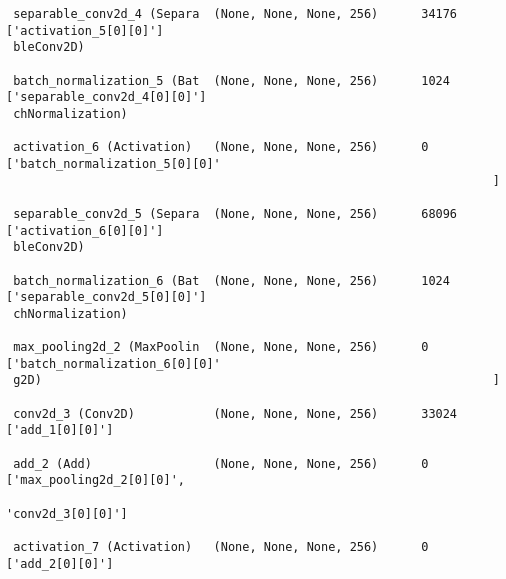 \documentclass[
  letterpaper,
  DIV=11,
  numbers=noendperiod]{scrreprt}
\begin{document}
\begin{verbatim}
 separable_conv2d_4 (Separa  (None, None, None, 256)      34176     ['activation_5[0][0]']        
 bleConv2D)                                                                                       
                                                                                                  
 batch_normalization_5 (Bat  (None, None, None, 256)      1024      ['separable_conv2d_4[0][0]']  
 chNormalization)                                                                                 
                                                                                                  
 activation_6 (Activation)   (None, None, None, 256)      0         ['batch_normalization_5[0][0]'
                                                                    ]                             
                                                                                                  
 separable_conv2d_5 (Separa  (None, None, None, 256)      68096     ['activation_6[0][0]']        
 bleConv2D)                                                                                       
                                                                                                  
 batch_normalization_6 (Bat  (None, None, None, 256)      1024      ['separable_conv2d_5[0][0]']  
 chNormalization)                                                                                 
                                                                                                  
 max_pooling2d_2 (MaxPoolin  (None, None, None, 256)      0         ['batch_normalization_6[0][0]'
 g2D)                                                               ]                             
                                                                                                  
 conv2d_3 (Conv2D)           (None, None, None, 256)      33024     ['add_1[0][0]']               
                                                                                                  
 add_2 (Add)                 (None, None, None, 256)      0         ['max_pooling2d_2[0][0]',     
                                                                     'conv2d_3[0][0]']            
                                                                                                  
 activation_7 (Activation)   (None, None, None, 256)      0         ['add_2[0][0]']               
                                                                                                  

\end{verbatim}
\end{document}
